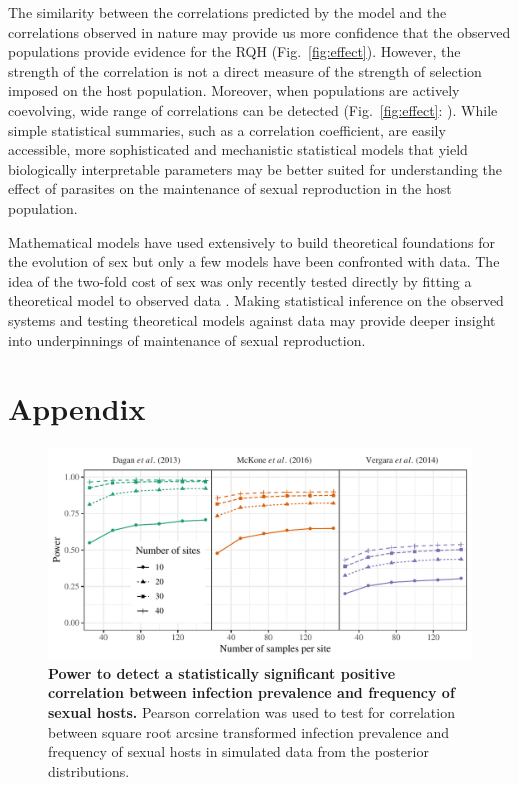 \documentclass{article}\usepackage[]{graphicx}\usepackage[]{color}
\newcommand{\fref}[1]{Fig.~\ref{fig:#1}}
\begin{document}
The similarity between the correlations predicted by the model and the correlations observed in nature may provide us more confidence that the observed populations provide evidence for the RQH (\fref{effect}).
However, the strength of the correlation is not a direct measure of the strength of selection imposed on the host population.
Moreover, when populations are actively coevolving, wide range of correlations can be detected (\fref{effect}: \cite{vergara2014infection}).
While simple statistical summaries, such as a correlation coefficient, are easily accessible,
more sophisticated and mechanistic statistical models that yield biologically interpretable parameters may be better suited for understanding the effect of parasites on the maintenance of sexual reproduction in the host population.

Mathematical models have used extensively to build theoretical foundations for the evolution of sex but only a few models have been confronted with data.
The idea of the two-fold cost of sex was only recently tested directly by fitting a theoretical model to observed data \citep{gibson2017two}.
Making statistical inference on the observed systems and testing theoretical models against data may provide deeper insight into underpinnings of maintenance of sexual reproduction.



\pagebreak
\section*{Appendix}

\renewcommand\thefigure{A\arabic{figure}}    
\setcounter{figure}{0}   

\begin{figure}[!ht]
\includegraphics[width=\textwidth]{../fig/power_lm.pdf}
\caption{{\bf Power to detect a statistically significant positive correlation between infection prevalence and frequency of sexual hosts.}
Pearson correlation was used to test for correlation between square root arcsine transformed infection prevalence and frequency of sexual hosts in simulated data from the posterior distributions.
}
\label{fig:power_lm}
\end{figure}
\end{document}
